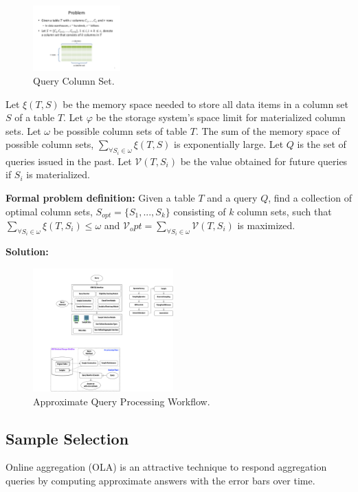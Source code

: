 \documentclass{sig-alternate-05-2015}
\begin{document}
\begin{figure}[htb]
        \centering
        \includegraphics[width=0.3\textwidth]{columnset.pdf}
        \caption{Query Column Set.}
        \label{fig:qcs}
\end{figure}

Let $\xi(T, S)$ be the memory space needed to store all data items in a column set $S$ of a table $T$.
Let $\varphi$ be the storage system's space limit for materialized column sets.
Let $\omega$ be possible column sets of table $T$. 
The sum of the memory space of possible column sets, $\sum_{\forall S_i \in \omega} \xi(T, S)$ is exponentially large.
Let $Q$ is the set of queries issued in the past.
Let $\mathcal{V}(T, S_i)$ be the value obtained for future queries if $S_i$ is materialized.

\noindent
\textbf{Formal problem definition:}  Given a table $T$ and a query $Q$, find a collection of optimal column sets, $S_{opt} = \{S_1, ..., S_k\}$ consisting of $k$ column sets, such that $\sum_{\forall S_i \in \omega} \xi(T, S_i) \leq \omega $ and $\mathcal{V}_opt = \sum_{\forall S_i \in \omega} \mathcal{V}(T, S_i) $ is maximized.

\noindent
\textbf{Solution:}

\begin{figure}[htb]
        \centering
        \includegraphics[width=0.48\textwidth]{workflow.pdf}
        \caption{Approximate Query Processing Workflow.}
        \label{fig:workflow}
\end{figure}

\subsection{Sample Selection}
Online aggregation (OLA) is an attractive technique to respond aggregation queries by computing approximate answers with the error bars over time.
\end{document}
